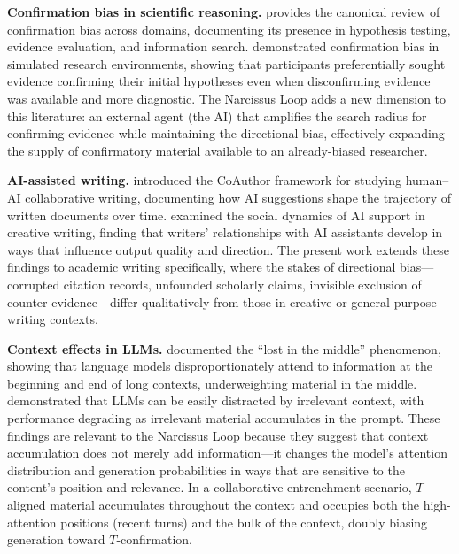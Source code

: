 \documentclass[12pt]{article}
\begin{document}
\textbf{Confirmation bias in scientific reasoning.} \citet{nickerson1998} provides the canonical review of confirmation bias across domains, documenting its presence in hypothesis testing, evidence evaluation, and information search. \citet{mynatt1977} demonstrated confirmation bias in simulated research environments, showing that participants preferentially sought evidence confirming their initial hypotheses even when disconfirming evidence was available and more diagnostic. The Narcissus Loop adds a new dimension to this literature: an external agent (the AI) that amplifies the search radius for confirming evidence while maintaining the directional bias, effectively expanding the supply of confirmatory material available to an already-biased researcher.

\textbf{AI-assisted writing.} \citet{lee2022} introduced the CoAuthor framework for studying human--AI collaborative writing, documenting how AI suggestions shape the trajectory of written documents over time. \citet{gero2023} examined the social dynamics of AI support in creative writing, finding that writers' relationships with AI assistants develop in ways that influence output quality and direction. The present work extends these findings to academic writing specifically, where the stakes of directional bias---corrupted citation records, unfounded scholarly claims, invisible exclusion of counter-evidence---differ qualitatively from those in creative or general-purpose writing contexts.

\textbf{Context effects in LLMs.} \citet{liu2024} documented the ``lost in the middle'' phenomenon, showing that language models disproportionately attend to information at the beginning and end of long contexts, underweighting material in the middle. \citet{shi2023} demonstrated that LLMs can be easily distracted by irrelevant context, with performance degrading as irrelevant material accumulates in the prompt. These findings are relevant to the Narcissus Loop because they suggest that context accumulation does not merely add information---it changes the model's attention distribution and generation probabilities in ways that are sensitive to the content's position and relevance. In a collaborative entrenchment scenario, $T$-aligned material accumulates throughout the context and occupies both the high-attention positions (recent turns) and the bulk of the context, doubly biasing generation toward $T$-confirmation.
\end{document}

